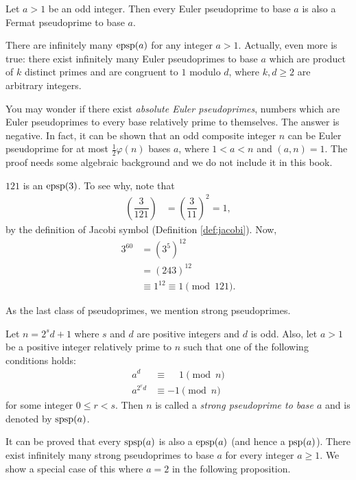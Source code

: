 \documentclass{subfile}
\begin{document}
	\begin{corollary}
		Let $a>1$ be an odd integer. Then every Euler pseudoprime to base $a$ is also a Fermat pseudoprime to base $a$.
	\end{corollary}

There are infinitely many $\operatorname{epsp}(a)$ for any integer $a>1$. Actually, even more is true: there exist infinitely many Euler pseudoprimes to base $a$ which are product of $k$ distinct primes and are congruent to $1$ modulo $d$, where $k, d \geq 2$ are arbitrary integers.

You may wonder if there exist \textit{absolute Euler pseudoprimes}, numbers which are Euler pseudoprimes to every base relatively prime to themselves. The answer is negative. In fact, it can be shown that an odd composite integer $n$ can be Euler pseudoprime for at most $\frac{1}{2}\varphi(n)$ bases $a$, where $1<a<n$ and $(a,n)=1$. The proof needs some algebraic background and we do not include it in this book.

	\begin{example}
		$121$ is an $\operatorname{epsp}(3)$. To see why, note that
			\begin{align*}
				\left(\dfrac{3}{121}\right)
					& = \left(\dfrac{3}{11}\right)^2 = 1,
			\end{align*}
		by the definition of Jacobi symbol (Definition \ref{def:jacobi}). Now,
			\begin{align*}
				3^{60}
					& = \left(3^5\right)^{12}\\
					& =\left(243\right)^{12}\\
					& \equiv 1^{12} \equiv 1 \pmod{121}.
			\end{align*}
	\end{example}

As the last class of pseudoprimes, we mention strong pseudoprimes.

	\begin{definition}
		Let $n=2^sd+1$ where $s$ and $d$ are positive integers and $d$ is odd. Also, let $a>1$ be a positive integer relatively prime to $n$ such that one of the following conditions holds:
			\begin{align*}
				a^d
					& \equiv \phantom{-} 1 \pmod n\\
				a^{2^rd} &\equiv -1 \pmod n
			\end{align*}
		for some integer $0 \leq r <s$. Then $n$ is called a \textit{strong pseudoprime to base $a$} and is denoted by $\operatorname{spsp}(a)$.
	\end{definition}
It can be proved that every $\operatorname{spsp}(a)$ is also a $\operatorname{epsp}(a)$ (and hence a $\operatorname{psp}(a)$). There exist infinitely many strong pseudoprimes to base $a$ for every integer $a \geq 1$. We show a special case of this where $a=2$ in the following proposition.
\end{document}
